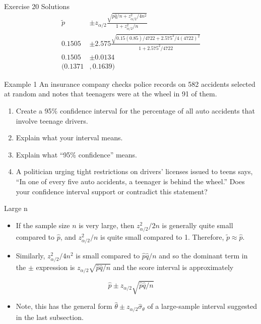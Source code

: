 \documentclass[
  ignorenonframetext,
]{beamer}
\providecommand{\tightlist}{%
  \setlength{\itemsep}{0pt}\setlength{\parskip}{0pt}}\usepackage{longtable,booktabs,array}
\begin{document}
\begin{frame}{Exercise 20 Solutions}
\protect\hypertarget{exercise-20-solutions-1}{}
\[
\begin{aligned}
\tilde{p} &\pm z_{\alpha/2}\frac{\sqrt{\hat{p}\hat{q}/n + z_{\alpha/2}^{2}/4n^{2}}}{1+z^{2}_{\alpha/2}/n} \\
0.1505 &\pm 2.575\frac{\sqrt{0.15(0.85)/4722 + 2.575^{2}/4(4722)^{2}}}{1+2.575^{2}/4722} \\
0.1505 &\pm 0.0134 \\
(0.1371&, 0.1639)
\end{aligned}
\]
\end{frame}

\begin{frame}{Example 1}
\protect\hypertarget{example-1}{}
An insurance company checks police records on 582 accidents selected at
random and notes that teenagers were at the wheel in 91 of them.

\begin{enumerate}[<+->]
[a.]
\tightlist
\item
  Create a 95\% confidence interval for the percentage of all auto
  accidents that involve teenage drivers.
\item
  Explain what your interval means.
\item
  Explain what ``95\% confidence'' means.
\item
  A politician urging tight restrictions on drivers' licenses issued to
  teens says, ``In one of every five auto accidents, a teenager is
  behind the wheel.'' Does your confidence interval support or
  contradict this statement?
\end{enumerate}
\end{frame}

\begin{frame}{Large n}
\protect\hypertarget{large-n}{}
\begin{itemize}[<+->]
\item
  If the sample size \(n\) is very large, then \(z_{\alpha/2}^{2}/2n\)
  is generally quite small compared to \(\hat{p}\), and
  \(z_{\alpha/2}^{2}/n\) is quite small compared to 1. Therefore,
  \(\tilde{p} \approx \hat{p}\).
\item
  Similarly, \(z_{\alpha/2}^{2}/4n^{2}\) is small compared to
  \(\hat{p}\hat{q}/n\) and so the dominant term in the \(\pm\)
  expression is \(z_{\alpha/2}\sqrt{\hat{p}\hat{q}/n}\) and the score
  interval is approximately
\end{itemize}

\[ 
\hat{p} \pm z_{\alpha/2}\sqrt{\hat{p}\hat{q}/n}
\]

\begin{itemize}[<+->]
\tightlist
\item
  Note, this has the general form
  \(\hat{\theta} \pm z_{\alpha/2}\hat{\sigma}_{\theta}\) of a
  large-sample interval suggested in the last subsection.
\end{itemize}
\end{frame}
\end{document}

